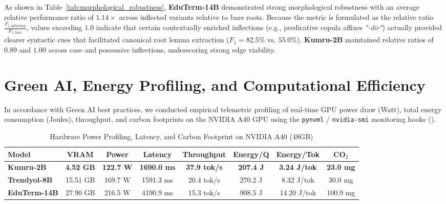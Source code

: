 \documentclass[a4paper,12pt]{report}
\begin{document}
As shown in Table~\ref{tab:morphological_robustness}, \textbf{EduTerm-14B} demonstrated strong morphological robustness with an average relative performance ratio of \textbf{$1.14\times$} across inflected variants relative to bare roots. Because the metric is formulated as the relative ratio $\frac{F_{1,\text{inflection}}}{F_{1,\text{bare}}}$, values exceeding $1.0$ indicate that certain contextually enriched inflections (e.g., predicative copula affixes \textit{"-dir"}) actually provided clearer syntactic cues that facilitated canonical root lemma extraction ($F_1 = 82.5\%$ vs. $55.0\%$). \textbf{Kumru-2B} maintained relative ratios of $0.89$ and $1.00$ across case and possessive inflections, underscoring strong edge viability.


\section{Green AI, Energy Profiling, and Computational Efficiency}
\label{sec:green_ai_profiling}
In accordance with Green AI best practices, we conducted empirical telemetric profiling of real-time GPU power draw (Watt), total energy consumption (Joules), throughput, and carbon footprints on the NVIDIA A40 GPU using the \texttt{pynvml} / \texttt{nvidia-smi} monitoring hooks ().

\begin{table}[htbp]
\centering
\small
\caption{Hardware Power Profiling, Latency, and Carbon Footprint on NVIDIA A40 (48GB)}
\label{tab:green_ai_profiling}
\scriptsize\setlength{\tabcolsep}{2pt}
\begin{tabularx}{\textwidth}{>{\RaggedRight\arraybackslash}Xccccccc}
\hline
\textbf{Model} & \textbf{VRAM} & \textbf{Power} & \textbf{Latency} & \textbf{Throughput} & \textbf{Energy/Q} & \textbf{Energy/Tok} & \textbf{CO$_2$} \\
\hline
\textbf{Kumru-2B} & \textbf{4.52 GB} & \textbf{122.7 W} & \textbf{1690.0 ms} & \textbf{37.9 tok/s} & \textbf{207.4 J} & \textbf{3.24 J/tok} & \textbf{23.0 mg} \\
\textbf{Trendyol-8B} & 15.51 GB & 169.7 W & 1591.3 ms & 20.4 tok/s & 270.2 J & 8.32 J/tok & 30.0 mg \\
\textbf{EduTerm-14B} & 27.90 GB & 216.5 W & 4190.9 ms & 15.3 tok/s & 908.5 J & 14.20 J/tok & 100.9 mg \\
\hline
\end{tabularx}
\end{table}
\end{document}
